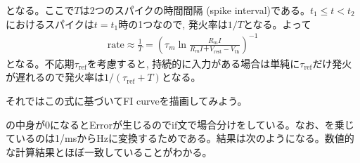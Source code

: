 \documentclass[letterpaper,10pt,english]{sphinxmanual}
\begin{document}
となる。ここで\(T\)は2つのスパイクの時間間隔 (spike interval)である。\(t_1\leq t<t_2\)におけるスパイクは\(t=t_1\)時の1つなので, 発火率は\(1/T\)となる。よって
\begin{equation*}
\begin{split}
\text{rate}\approx \frac{1}{T}=\left(\tau_m \ln \frac{R_mI}{R_mI＋V_\text{rest}-V_{\text{th}}}\right)^{-1}
\end{split}
\end{equation*}
となる。不応期\(\tau_{\text{ref}}\)を考慮すると, 持続的に入力がある場合は単純に\(\tau_{\text{ref}}\)だけ発火が遅れるので発火率は\(1/(\tau_{\text{ref}}+T)\)となる。

それではこの式に基づいてF\sphinxhyphen{}I curveを描画してみよう。

\begin{sphinxVerbatim}[commandchars=\\\{\}]
   
   

   
   
   
  

   
      \PYG{p}{[}\PYG{p}{]}  \PYG{p}{[}\PYG{p}{]}    
       
        \PYG{p}{[}\PYG{p}{]}          
        \PYG{p}{[}\PYG{p}{]}  
\end{sphinxVerbatim}

の中身が0になるとErrorが生じるのでif文で場合分けをしている。なお、を乗じているのは1/msからHzに変換するためである。結果は次のようになる。数値的な計算結果とほぼ一致していることがわかる。
\end{document}
